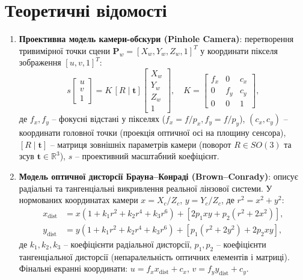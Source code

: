 \documentclass[14pt, a4paper]{extarticle}
\begin{document}
\section{Теоретичні відомості}
\begin{enumerate}
    \item \textbf{Проективна модель камери-обскури (Pinhole Camera)}: перетворення тривимірної точки сцени $\mathbf{P}_w = [X_w, Y_w, Z_w, 1]^T$ у координати пікселя зображення $[u, v, 1]^T$:
    \begin{equation}
        s \begin{bmatrix} u \\ v \\ 1 \end{bmatrix} = K \, [R \mid \mathbf{t}] \begin{bmatrix} X_w \\ Y_w \\ Z_w \\ 1 \end{bmatrix},
        \quad
        K = \begin{bmatrix} f_x & 0 & c_x \\ 0 & f_y & c_y \\ 0 & 0 & 1 \end{bmatrix},
    \end{equation}
    де $f_x, f_y$ -- фокусні відстані у пікселях ($f_x = f / p_x, f_y = f / p_y$), $(c_x, c_y)$ -- координати головної точки (проекція оптичної осі на площину сенсора), $[R \mid \mathbf{t}]$ -- матриця зовнішніх параметрів камери (поворот $R \in SO(3)$ та зсув $\mathbf{t} \in \mathbb{R}^3$), $s$ -- проективний масштабний коефіцієнт.

    \item \textbf{Модель оптичної дисторсії Брауна--Конраді (Brown--Conrady)}: описує радіальні та тангенціальні викривлення реальної лінзової системи. У нормованих координатах камери $x = X_c / Z_c$, $y = Y_c / Z_c$, де $r^2 = x^2 + y^2$:
    \begin{align}
        x_{\text{dist}} &= x (1 + k_1 r^2 + k_2 r^4 + k_3 r^6) + \left[ 2 p_1 x y + p_2 (r^2 + 2 x^2) \right], \\
        y_{\text{dist}} &= y (1 + k_1 r^2 + k_2 r^4 + k_3 r^6) + \left[ p_1 (r^2 + 2 y^2) + 2 p_2 x y \right],
    \end{align}
    де $k_1, k_2, k_3$ -- коефіцієнти радіальної дисторсії, $p_1, p_2$ -- коефіцієнти тангенціальної дисторсії (непаралельність оптичних елементів і матриці). Фінальні екранні координати: $u = f_x x_{\text{dist}} + c_x$, $v = f_y y_{\text{dist}} + c_y$.


\end{enumerate}
\end{document}
